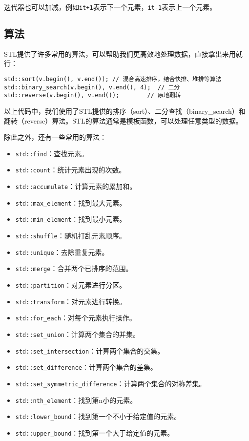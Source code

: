\documentclass[../main.tex]{subfiles}
\begin{document}
迭代器也可以加减，例如\texttt{it+1}表示下一个元素，\texttt{it-1}表示上一个元素。

\subsection{算法}
STL提供了许多常用的算法，可以帮助我们更高效地处理数据，直接拿出来用就行：
\begin{lstlisting}
std::sort(v.begin(), v.end()); // 混合高速排序，结合快排、堆排等算法
std::binary_search(v.begin(), v.end(), 4);  // 二分
std::reverse(v.begin(), v.end());        // 原地翻转
\end{lstlisting}

以上代码中，我们使用了STL提供的排序（sort）、二分查找（binary\_search）和翻转（reverse）算法。STL的算法通常是模板函数，可以处理任意类型的数据。

除此之外，还有一些常用的算法：
\begin{itemize}
  \item \texttt{std::find}：查找元素。
  \item \texttt{std::count}：统计元素出现的次数。
  \item \texttt{std::accumulate}：计算元素的累加和。
  \item \texttt{std::max\_element}：找到最大元素。
  \item \texttt{std::min\_element}：找到最小元素。
  \item \texttt{std::shuffle}：随机打乱元素顺序。
  \item \texttt{std::unique}：去除重复元素。
  \item \texttt{std::merge}：合并两个已排序的范围。
  \item \texttt{std::partition}：对元素进行分区。
  \item \texttt{std::transform}：对元素进行转换。
  \item \texttt{std::for\_each}：对每个元素执行操作。
  \item \texttt{std::set\_union}：计算两个集合的并集。
  \item \texttt{std::set\_intersection}：计算两个集合的交集。
  \item \texttt{std::set\_difference}：计算两个集合的差集。
  \item \texttt{std::set\_symmetric\_difference}：计算两个集合的对称差集。
  \item \texttt{std::nth\_element}：找到第n小的元素。
  \item \texttt{std::lower\_bound}：找到第一个不小于给定值的元素。
  \item \texttt{std::upper\_bound}：找到第一个大于给定值的元素。
\end{itemize}
\end{document}
